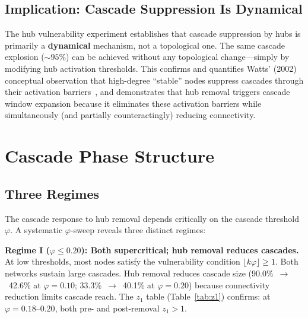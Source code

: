 \documentclass[aps,pre,twocolumn,superscriptaddress,showpacs]{revtex4-2}
\begin{document}
\subsection{Implication: Cascade Suppression Is Dynamical}

The hub vulnerability experiment establishes that cascade suppression by hubs is primarily a \textbf{dynamical} mechanism, not a topological one. The same cascade explosion ($\sim 95\%$) can be achieved without any topological change---simply by modifying hub activation thresholds. This confirms and quantifies Watts' (2002) conceptual observation that high-degree ``stable'' nodes suppress cascades through their activation barriers~\cite{Watts2002}, and demonstrates that hub removal triggers cascade window expansion because it eliminates these activation barriers while simultaneously (and partially counteractingly) reducing connectivity.

\section{Cascade Phase Structure}
\label{sec:phase}

\subsection{Three Regimes}

The cascade response to hub removal depends critically on the cascade threshold $\varphi$. A systematic $\varphi$-sweep reveals three distinct regimes:

\textbf{Regime I ($\varphi \leq 0.20$): Both supercritical; hub removal reduces cascades.} At low thresholds, most nodes satisfy the vulnerability condition $\lfloor k\varphi \rfloor \geq 1$. Both networks sustain large cascades. Hub removal reduces cascade size (90.0\%~$\to$~42.6\% at $\varphi=0.10$; 33.3\%~$\to$~40.1\% at $\varphi=0.20$) because connectivity reduction limits cascade reach. The $z_1$ table (Table~\ref{tab:z1}) confirms: at $\varphi=0.18$--$0.20$, both pre- and post-removal $z_1 > 1$.
\end{document}
